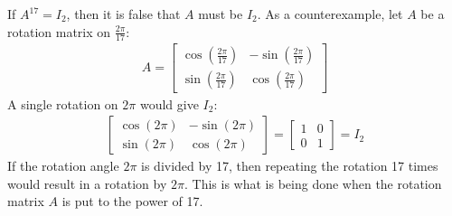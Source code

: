 \documentclass[letterpaper,12pt]{report}
\begin{document}
If $A^{17} = I_2$, then it is false that $A$ must be $I_2$. As a counterexample, let $A$ be a rotation matrix on $\frac{2\pi}{17}$:
\begin{align*}
  A = \begin{bmatrix}
    \cos(\frac{2\pi}{17}) & -\sin(\frac{2\pi}{17}) \\
    \sin(\frac{2\pi}{17}) & \cos(\frac{2\pi}{17})
  \end{bmatrix}
\end{align*}
A single rotation on $2\pi$ would give $I_2$:
\begin{align*}
  \begin{bmatrix}
    \cos(2\pi) & -\sin(2\pi) \\
    \sin(2\pi) & \cos(2\pi)
  \end{bmatrix} = \begin{bmatrix}
    1 & 0 \\
    0 & 1
  \end{bmatrix} = I_2
\end{align*}
If the rotation angle $2\pi$ is divided by 17, then repeating the rotation 17 times would result in a rotation by $2\pi$. This is what is being done when the rotation matrix $A$ is put to the power of 17.
\end{document}
